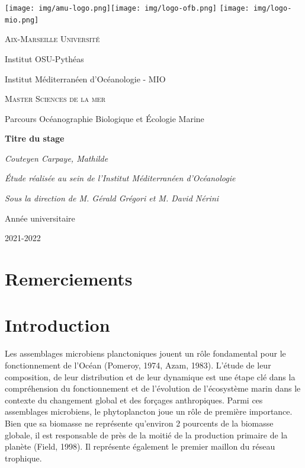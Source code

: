 \documentclass[12pt]{article}
\renewcommand{\thepage}{}
\newcommand\myemptypage{
    \null
    \thispagestyle{empty}
    \newpage
    }
\begin{document}
\begin{titlepage}
\centering
\texttt{[image: img/amu-logo.png]}\hfill  \texttt{[image: img/logo-ofb.png]} \hfill \texttt{[image: img/logo-mio.png]}\par\vspace{1cm}
{\scshape\large Aix-Marseille Université\par}
{\large Institut OSU-Pythéas\par}
Institut Méditerranéen d’Océanologie - MIO \par
\vspace{2cm}
{\scshape\large Master Sciences de la mer\par}
{\large Parcours Océanographie Biologique et Écologie Marine\par}
\vspace{2cm}
{\LARGE \bfseries Titre du stage\par}
\vspace{.5cm}
{\large \itshape Couteyen Carpaye, Mathilde\par}
\vfill
{\itshape Étude réalisée au sein de l'Institut Méditerranéen d'Océanologie\par}
{\itshape Sous la direction de M. Gérald Grégori et M. David Nérini\par }
\vfill
Année universitaire\par
2021-2022
\end{titlepage}

\myemptypage

\section*{Remerciements}


\newpage


\newpage
\tableofcontents
\newpage

\renewcommand{\thepage}{\arabic{page}}
\setcounter{page}{1}

\section{Introduction}


Les assemblages microbiens  planctoniques jouent un rôle fondamental pour le fonctionnement de l’Océan (Pomeroy, 1974, Azam, 1983). L’étude de leur composition, de leur distribution et de leur dynamique est une étape clé dans la compréhension du fonctionnement et de l’évolution de l’écosystème marin dans le contexte du changement global et des forçages anthropiques. Parmi ces assemblages microbiens, le phytoplancton joue un rôle de première importance. Bien que sa biomasse ne représente qu’environ 2 pourcents de la biomasse globale, il est responsable de près de la moitié de la production primaire de la planète (Field, 1998). Il représente également le premier maillon du réseau trophique.
\end{document}
